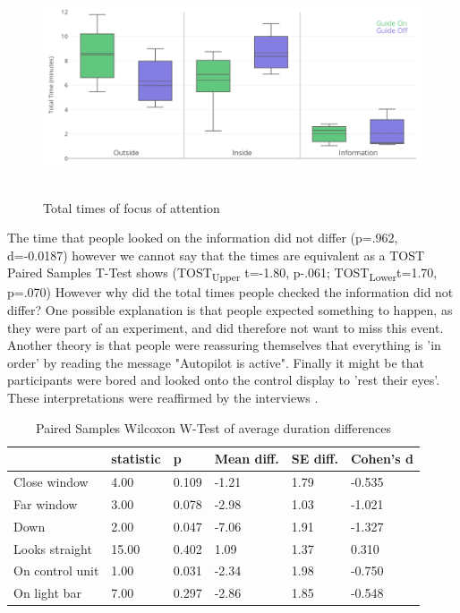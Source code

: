 \begin{figure}
    \includegraphics[width=1\textwidth]{fig/Total.png}\hfill\
    \caption[Times of Attention]{Total times of focus of attention}
    \label{fig:attentionTotal}
\end{figure}

The time that people looked on the information did not differ (p=.962, d=-0.0187) however we cannot say that the times are equivalent as a TOST \cite{Details2012EquivalenceProportions} Paired Samples T-Test shows
(TOST\textsubscript{Upper} t=-1.80, p-.061; TOST\textsubscript{Lower}t=1.70, p=.070)
However why did the total times people checked the information did not differ? One possible explanation is that people expected something to happen, as they were part of an experiment, and did therefore not want to miss this event. Another theory is that people were reassuring themselves that everything is 'in order' by reading the message "Autopilot is active". Finally it might be that participants were bored and looked onto the control display to 'rest their eyes'. These interpretations were reaffirmed by the interviews . 

\begin{table}[]
\label{tab:averageVideo}
  \caption{Paired Samples Wilcoxon W-Test of average duration differences}
\begin{tabular}{@{}llllll@{}}
\toprule
 & statistic & p & Mean diff. & SE diff. & Cohen's d \\ \midrule
Close window & 4.00 & 0.109 & -1.21 & 1.79 & -0.535 \\
Far window & 3.00 & 0.078 & -2.98 & 1.03 & -1.021 \\
Down & 2.00 & 0.047 & -7.06 & 1.91 & -1.327 \\
Looks straight & 15.00 & 0.402 & 1.09 & 1.37 & 0.310 \\
On control unit & 1.00 & 0.031 & -2.34 & 1.98 & -0.750 \\
On light bar & 7.00 & 0.297 & -2.86 & 1.85 & -0.548 \\ \bottomrule
\end{tabular}
\end{table}

